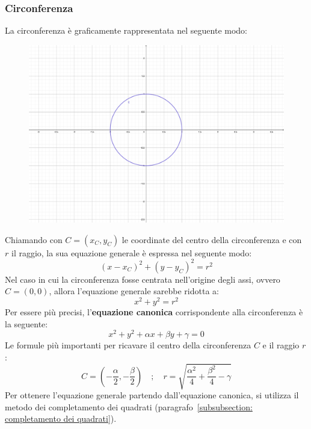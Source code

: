 \documentclass[a4paper]{article}
\begin{document}
	\subsubsection{Circonferenza}\label{subsubsection: circonferenza}
	
	La circonferenza è graficamente rappresentata nel seguente modo:
	\begin{figure}[!htp]
		\centering
		\includegraphics[width=.6\textwidth]{img/circonferenza.pdf}
	\end{figure}
	
	\noindent
	Chiamando con $C = \left(x_{C}, y_{C}\right)$ le coordinate del centro della circonferenza e con $r$ il raggio, la sua equazione generale è espressa nel seguente modo:
	\begin{equation*}
		\left(x-x_{C}\right)^{2} + \left(y-y_{C}\right)^{2} = r^{2}
	\end{equation*}
	Nel caso in cui la circonferenza fosse centrata nell'origine degli assi, ovvero $C = \left(0,0\right)$, allora l'equazione generale sarebbe ridotta a:
	\begin{equation*}
		x^{2} + y^{2} = r^{2}
	\end{equation*}
	Per essere più precisi, l'\textbf{equazione canonica} corrispondente alla circonferenza è la seguente:
	\begin{equation*}
		x^{2} + y^{2} + \alpha x + \beta y + \gamma = 0
	\end{equation*}
	Le formule più importanti per ricavare il centro della circonferenza $C$ e il raggio $r$:
	\begin{equation*}
		C = \left(-\dfrac{\alpha}{2}, -\dfrac{\beta}{2}\right) \hspace{1em} ; \hspace{1em} r = \sqrt{\dfrac{\alpha^{2}}{4} + \dfrac{\beta^{2}}{4} - \gamma}
	\end{equation*}
	Per ottenere l'equazione generale partendo dall'equazione canonica, si utilizza il metodo dei completamento dei quadrati (paragrafo~\ref{subsubsection: completamento dei quadrati}).\newline
	
\end{document}
